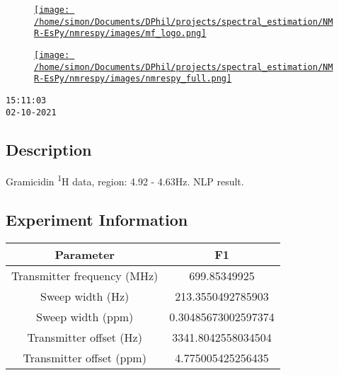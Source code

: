 \documentclass[8pt]{article}
\begin{document}
\begin{figure}[!ht]
\begin{minipage}[b][2.5cm][c]{.72\textwidth}
\href{http://foroozandeh.chem.ox.ac.uk/home}%
{\texttt{[image: /home/simon/Documents/DPhil/projects/spectral\_estimation/NMR-EsPy/nmrespy/images/mf\_logo.png]}}
\end{minipage}
\begin{minipage}[b][2.5cm][c]{.27\textwidth}
\href{https://foroozandehgroup.github.io/NMR-EsPy}%
{\texttt{[image: /home/simon/Documents/DPhil/projects/spectral\_estimation/NMR-EsPy/nmrespy/images/nmrespy\_full.png]}}
\end{minipage}
\end{figure}

\texttt{15:11:03\\02-10-2021}

\subsection*{Description}
Gramicidin \textsuperscript{1}H data, region: 4.92 - 4.63Hz. NLP result.

\subsection*{Experiment Information}
\hspace{-6pt}
\begin{longtable}[l]{c c}
\toprule
Parameter & F1
\\\midrule
Transmitter frequency (MHz) & 699.85349925\\
Sweep width (Hz) & 213.3550492785903\\
Sweep width (ppm) & 0.30485673002597374\\
Transmitter offset (Hz) & 3341.8042558034504\\
Transmitter offset (ppm) & 4.775005425256435\\
\bottomrule
\end{longtable}

\end{document}
